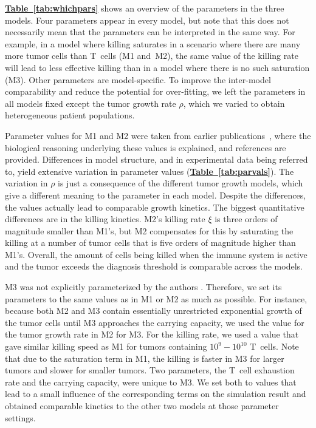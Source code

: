 \documentclass[a4paper,10pt]{article}
\newcommand{\mytab}[1]{\hyperref[#1]{\bfseries Table~\ref*{#1}}}
\newcommand{\newbit}{\color{red!70!black}}
\begin{document}
{\newbit
{}
\mytab{tab:whichpars}
shows an overview of the parameters in the three models. Four parameters appear in every model, but note that this does not necessarily mean that the parameters can be interpreted in the same way. For example, in a model where killing saturates in a scenario where there are many more tumor cells than T~cells (M1 and~M2), the same value of the killing rate will lead to less effective killing than in a model where there is no such saturation (M3). Other parameters are model-specific. To improve the inter-model comparability and reduce the potential for over-fitting, we left the parameters in all models fixed except the tumor growth rate $\rho$, which we varied to obtain heterogeneous patient populations.

Parameter values for M1 and M2 were taken from earlier publications~\cite{Creemers2021,Tsur2020}, where the biological reasoning underlying these values is explained, and references are provided. Differences in model structure, and in experimental data being referred to, yield extensive variation in parameter values (\mytab{tab:parvals}). The variation in $\rho$ is just a consequence of the different tumor growth models, which give a different meaning to the parameter in each model. Despite the differences, the values actually lead to comparable growth kinetics.
 The biggest quantitative differences are in the killing kinetics. M2's killing rate $\xi$ is three orders of magnitude smaller than M1's, but M2 compensates for this by saturating the killing at a number of tumor cells that is five orders of magnitude higher than M1's. Overall, the amount of cells being killed when the immune system is active and the tumor exceeds the diagnosis threshold is comparable across the models.

M3 was not explicitly parameterized by the authors \cite{Bekker2022}. Therefore, we set its parameters to the same values as in M1 or M2 as much as possible. For instance, because both M2 and M3 contain essentially unrestricted exponential growth of the tumor cells until M3 approaches the carrying capacity, we used the value for the tumor growth rate in M2 for M3. For the killing rate, we used a value that gave similar killing speed as M1 for tumors containing $10^{9}-10^{10}$ T~cells. Note that due to the saturation term in M1, the killing is faster in M3 for larger tumors and slower for smaller tumors. Two parameters, the T~cell exhaustion rate and the carrying capacity, were unique to M3. We set both to values that lead to a small influence of the corresponding terms on the simulation result and obtained comparable kinetics to the other two models at those parameter settings.
}
\end{document}
